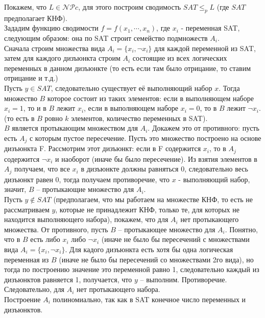 \documentclass[a4paper,12pt]{article} %
\begin{document}
Покажем, что $L \in \mathcal{NP}c$, для этого построим сводимость $SAT \leq_p L$ (где $ SAT $ предполагает КНФ).\\
Зададим функцию сводимости $ f = f(x_1, \cdots , x_n) $, где $ x_i $ - переменная SAT, следующим образом: она по SAT строит семейство подмножеств $ A_i $.\\
Сначала строим множества вида $A_i = \{x_i, \neg x_i\}$ для каждой переменной из SAT, затем для каждого дизъюнкта строим $ A_i $ состоящие из всех логических переменных в данном дизъюнкте (то есть если там было отрицание, то ставим отрицание и т.д.)\\

Пусть $ y \in SAT $, следовательно существует её выполняющий набор $ x $. Тогда множество $ B $ которое состоит из таких элементов: если в выполняющем наборе $ x_i = 1 $, то и в $ B $ лежит $ x_i $, если в выполняющем наборе $ x_i = 0 $, то в $ B $ лежит $ \neg x_i $. (то есть в $ B $ ровно $ k $ элементов, количество переменных в SAT).\\
$ B $ является протыкающим множеством для $ A_i $. Докажем это от противного: пусть есть $ A_j $ с которым пустое пересечение. Пусть это множество построено на основе дизъюнкта F. Рассмотрим этот дизъюнкт: если в F содержится $ x_i $, то в $A_j$ содержится $ \neg x_i $ и наоборот (иначе бы было пересечение). Из взятия элементов в $ A_j $ получаем, что все $ x_i $ в дизъюнкте должны равняться 0, следовательно весь дизъюнкт равен 0, тогда получаем противоречие, что $ x $ - выполняющий набор, значит, $ B $ -- протыкающие множество для $ A_i $.\\

Пусть $ y \notin SAT$ (предполагаем, что мы работаем на множестве КНФ, то есть не рассматриваем $ y $, которые не принадлежит КНФ, только те, для которых не находится выполняющего набора), покажем, что для $ A_i $ нет протыкающего множества. От противного, пусть $ B $ -- протыкающее множество для $ A_i $. Понятно, что в $ B $ есть либо $ x_i $ либо $ \neg x_i $ (иначе не было бы пересечений с множествами вида $ A_i = \{x_i, \neg x_i \} $. Для кадого дизъюнкта есть хотя бы одна логическая переменная из $ B $ (иначе не было бы пересечений со множествами 2го вида), но тогда по построению значение это переменной равно 1, следовательно каждый из дизъюнктов равняется 1, получается, что $ y $ -- выполним. Противоречие. Следовательно, для $ A_i $ нет протыкающего набора.\\
Построение $ A_i $ полиномиально, так как в SAT конечное число переменных и дизъюнктов. 
\end{document}
